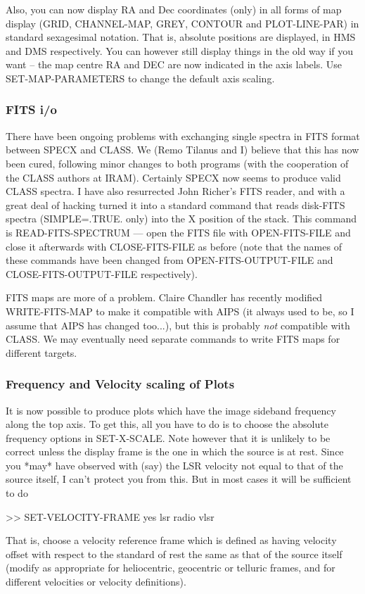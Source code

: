 \documentclass[twoside,11pt,nolof]{starlink}
\begin{document}
Also, you can now display RA and Dec coordinates (only) in all forms of
map display (GRID, CHANNEL-MAP, GREY, CONTOUR and PLOT-LINE-PAR) in
standard sexagesimal notation. That is, absolute positions are displayed,
in HMS and DMS respectively. You can however still display things in the
old way if you want -- the map centre RA and DEC are now indicated in the
axis labels. Use SET-MAP-PARAMETERS to change the default axis scaling.


\subsubsection{FITS i/o}

There have been ongoing problems with exchanging single spectra in FITS
format between SPECX and CLASS. We (Remo Tilanus and I) believe that
this has now been cured, following minor changes to both programs (with
the cooperation of the CLASS authors at IRAM). Certainly SPECX now
seems to produce valid CLASS spectra. I have also resurrected John
Richer's FITS reader, and with a great deal of hacking turned it into a
standard command that reads disk-FITS spectra (SIMPLE=.TRUE. only) into
the X position of the stack. This command is READ-FITS-SPECTRUM   ---
open the FITS file with OPEN-FITS-FILE and close it afterwards with
CLOSE-FITS-FILE as before (note that the names of these commands have
been changed from OPEN-FITS-OUTPUT-FILE and CLOSE-FITS-OUTPUT-FILE
respectively).

FITS maps are more of a problem. Claire Chandler has recently modified
WRITE-FITS-MAP to make it compatible with AIPS (it always used to be, so I
assume that AIPS has changed too...), but this is probably \emph{not}
compatible with CLASS. We may eventually need separate commands to write FITS
maps for different targets.


\subsubsection{Frequency and Velocity scaling of Plots}

It is now possible to produce plots which have the image sideband
frequency along the top axis. To get this, all you have to do is to
choose the absolute frequency options in SET-X-SCALE. Note however
that it is unlikely to be correct unless the display frame is the one
in which the source is at rest. Since you *may* have observed with
(say) the LSR velocity not equal to that of the source itself, I can't
protect you from this. But in most cases it will be sufficient to do
\begin{terminalv}
>> SET-VELOCITY-FRAME yes lsr radio vlsr
\end{terminalv}
That is, choose a velocity reference frame which is defined as having
velocity offset with respect to the standard of rest the same as that
of the source itself (modify as appropriate for heliocentric,
geocentric or telluric frames, and for different velocities or velocity
definitions).
\end{document}
